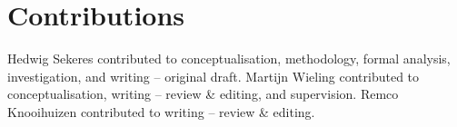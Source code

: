\documentclass[output=paper,colorlinks,citecolor=brown,draft]{langscibook}
\DeclareRobustCommand{\VAN}[3]{#3} %
\begin{document}


\section*{Contributions}
Hedwig Sekeres contributed to conceptualisation, methodology, formal analysis, investigation, and writing -- original draft.
Martijn Wieling contributed to conceptualisation, writing -- review \& editing, and supervision.
Remco Knooihuizen contributed to writing -- review \& editing.

\sloppy
\printbibliography[heading=subbibliography,notkeyword=this]
\end{document}
